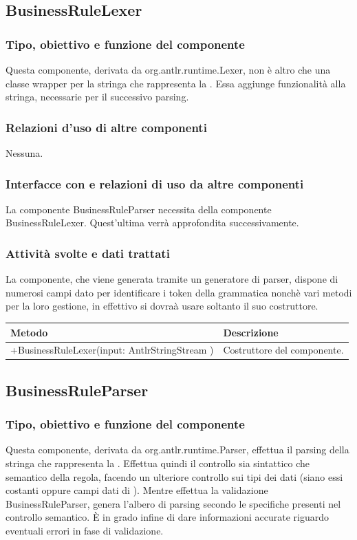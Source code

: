 \documentclass[11pt,titlepage,a4paper]{report}
\begin{document}
\subsection{BusinessRuleLexer}
\subsubsection{Tipo, obiettivo e funzione del componente}
Questa componente, derivata da org.antlr.runtime.Lexer, non \`e altro che una classe wrapper per la stringa che rappresenta la \br. Essa aggiunge funzionalit\`a alla stringa, necessarie per il successivo parsing.
\subsubsection{Relazioni d'uso di altre componenti}
Nessuna.
\subsubsection{Interfacce con e relazioni di uso da altre componenti}
La componente BusinessRuleParser necessita della componente BusinessRuleLexer. Quest'ultima verr\`a approfondita successivamente.
\subsubsection{Attivit\`a svolte e dati trattati}
La componente, che viene generata tramite un generatore di parser, dispone di numerosi campi dato per identificare i token della grammatica nonch\`e vari metodi per la loro gestione, in effettivo si dovra\`a usare soltanto il suo costruttore.
\begin{center}
\begin{tabular}{||p{6cm}||p{6cm}||} \hline
\hline
Metodo & Descrizione \\  \hline
+BusinessRuleLexer(input: AntlrStringStream ) & Costruttore del componente.\\ \hline
\end{tabular}
\end{center}

\subsection{BusinessRuleParser}
\subsubsection{Tipo, obiettivo e funzione del componente}
Questa componente, derivata da org.antlr.runtime.Parser, effettua il parsing della stringa che rappresenta la \br. Effettua quindi il controllo sia sintattico che semantico della regola, facendo un ulteriore controllo sui tipi dei dati (siano essi costanti oppure campi dati di \bos). Mentre effettua la validazione BusinessRuleParser, genera l'albero di parsing secondo le specifiche presenti nel controllo semantico. \`E in grado infine di dare informazioni accurate riguardo eventuali errori in fase di validazione.
\end{document}
